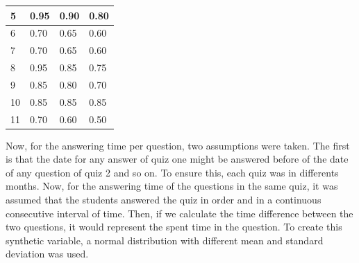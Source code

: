 \begin{table}[ht!]
\begin{tabular}{|l|l|l|l|}
5    & 0.95                                                            & 0.90                                                              & 0.80                                                           \\ \hline
6    & 0.70                                                            & 0.65                                                              & 0.60                                                           \\ \hline
7    & 0.70                                                            & 0.65                                                              & 0.60                                                           \\ \hline
8    & 0.95                                                            & 0.85                                                              & 0.75                                                           \\ \hline
9    & 0.85                                                            & 0.80                                                              & 0.70                                                           \\ \hline
10   & 0.85                                                            & 0.85                                                              & 0.85                                                           \\ \hline
11   & 0.70                                                            & 0.60                                                              & 0.50                                                           \\ \hline
\end{tabular}
\end{table}

Now, for the answering time per question, two assumptions were taken. The first is that the date for any answer of quiz one might be answered before of the date of any question of quiz 2 and so on. To ensure this, each quiz was in differents months. Now, for the answering time of the questions in the same quiz, it was assumed that the students answered the quiz in order and in a continuous consecutive interval of time. Then, if we calculate the time difference between the two questions, it would represent the spent time in the question. To create this synthetic variable,  a normal distribution with different mean and standard deviation was used.


